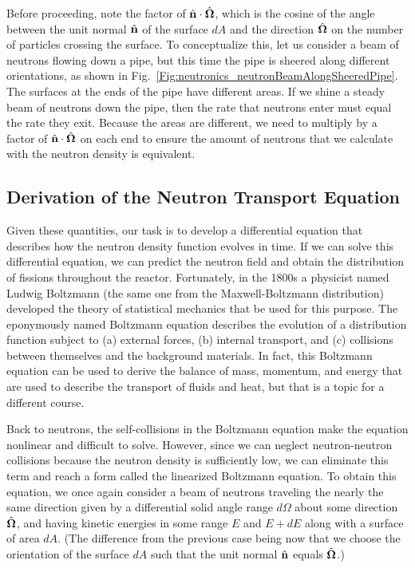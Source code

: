 Before proceeding, note the factor of $\hat{\mathbf{n}} \cdot \hat{\mathbf{\Omega}}$, which is the cosine of the angle between the unit normal $\hat{\mathbf{n}}$ of the surface $dA$ and the direction $\hat{\mathbf{\Omega}}$ on the number of particles crossing the surface. To conceptualize this, let us consider a beam of neutrons flowing down a pipe, but this time the pipe is sheered along different orientations, as shown in Fig.~\ref{Fig:neutronics_neutronBeamAlongSheeredPipe}. The surfaces at the ends of the pipe have different areas. If we shine a steady beam of neutrons down the pipe, then the rate that neutrons enter must equal the rate they exit. Because the areas are different, we need to multiply by a factor of $\hat{\mathbf{n}} \cdot \hat{\mathbf{\Omega}}$ on each end to ensure the amount of neutrons that we calculate with the neutron density is equivalent.

\subsection{Derivation of the Neutron Transport Equation}

Given these quantities, our task is to develop a differential equation that describes how the neutron density function evolves in time. If we can solve this differential equation, we can predict the neutron field and obtain the distribution of fissions throughout the reactor. Fortunately, in the 1800s a physicist named Ludwig Boltzmann (the same one from the Maxwell-Boltzmann distribution) developed the theory of statistical mechanics that be used for this purpose. The eponymously named Boltzmann equation describes the evolution of a distribution function subject to (a) external forces, (b) internal transport, and (c) collisions between themselves and the background materials. In fact, this Boltzmann equation can be used to derive the balance of mass, momentum, and energy that are used to describe the transport of fluids and heat, but that is a topic for a different course.

Back to neutrons, the self-collisions in the Boltzmann equation make the equation nonlinear and difficult to solve. However, since we can neglect neutron-neutron collisions because the neutron density is sufficiently low, we can eliminate this term and reach a form called the linearized Boltzmann equation. To obtain this equation, we once again consider a beam of neutrons traveling the nearly the same direction given by a differential solid angle range $d\Omega$ about some direction $\hat{\mathbf{\Omega}}$, and having kinetic energies in some range $E$ and $E + dE$ along with a surface of area $dA$. (The difference from the previous case being now that we choose the orientation of the surface $dA$ such that the unit normal $\hat{\mathbf{n}}$ equals $\hat{\mathbf{\Omega}}$.)

